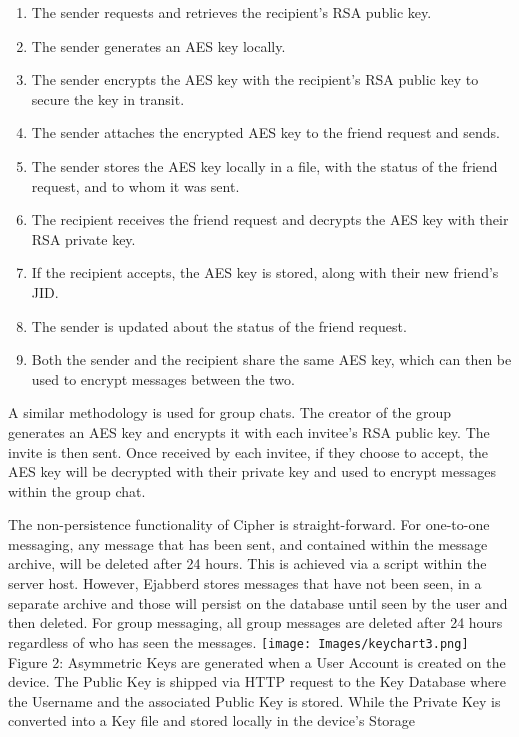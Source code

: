 \documentclass[12pt]{article}
\begin{document}
\begin{enumerate}
\item The sender requests and retrieves the recipient’s RSA public key.
\item The sender generates an AES key locally. 
\item The sender encrypts the AES key with the recipient’s RSA public key to secure the key in transit.
\item The sender attaches the encrypted AES key to the friend request and sends.
\item The sender stores the AES key locally in a file, with the status of the friend request, and to whom it was sent. 
\item The recipient receives the friend request and decrypts the AES key with their RSA private key.
\item If the recipient accepts, the AES key is stored, along with their new friend’s JID. 
\item The sender is updated about the status of the friend request.
\item Both the sender and the recipient share the same AES key, which can then be used to encrypt messages between the two. 
\end{enumerate}

A similar methodology is used for group chats. The creator of the group generates an AES key and encrypts it with each invitee’s RSA public key. The invite is then sent. Once received by each invitee, if they choose to accept, the AES key will be decrypted with their private key and used to encrypt messages within the group chat.

The non-persistence functionality of Cipher is straight-forward. For one-to-one messaging, any message that has been sent, and contained within the message archive, will be deleted after 24 hours. This is achieved via a script within the server host. However, Ejabberd stores messages that have not been seen, in a separate archive and those will persist on the database until seen by the user and then deleted. For group messaging, all group messages are deleted after 24 hours regardless of who has seen the messages.
\centering
\texttt{[image: Images/keychart3.png]}
\centering Figure 2: Asymmetric Keys are generated when a User Account is created on the device. The Public Key is shipped via HTTP request to the Key Database where the Username and the associated Public Key is stored. While the Private Key is converted into a Key file and stored locally in the device’s Storage  
\end{document}

